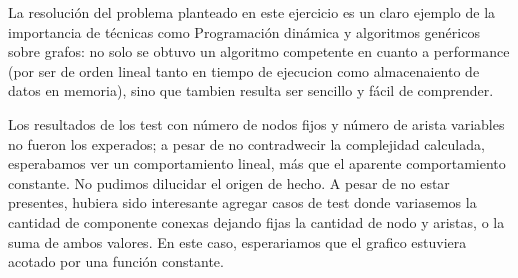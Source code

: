 La resoluci\'on del problema planteado en este ejercicio es un claro ejemplo de la importancia de t\'ecnicas como Programaci\'on din\'amica y algoritmos gen\'ericos sobre grafos: no solo se obtuvo un algoritmo competente en cuanto a performance (por ser de orden lineal tanto en tiempo de ejecucion como almacenaiento de datos en memoria), sino que tambien resulta ser sencillo y f\'acil de comprender.

Los resultados de los test con n\'umero de nodos fijos y n\'umero de arista variables no fueron los experados; a pesar de no contradwecir la complejidad calculada, esperabamos ver un comportamiento lineal, m\'as que el aparente comportamiento constante. No pudimos dilucidar el origen de hecho.
A pesar de no estar presentes, hubiera sido interesante agregar casos de test donde variasemos la cantidad de componente conexas dejando fijas la cantidad de nodo y aristas, o la suma de ambos valores. En este caso, esperariamos que el grafico estuviera acotado por una funci\'on constante.

